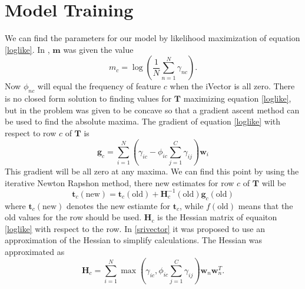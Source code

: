 \section{Model Training}
\label{sect:ivecttrain}

We can find the parameters for our model by likelihood maximization of equation \ref{loglike}. In \cite{lrivector}, $\mathbf{m}$ was given the value
\begin{equation}
\label{mest}
m_c=\log\left(\frac{1}{N} \sum_{n=1}^N \gamma_{nc}\right).
\end{equation} 
Now $\phi_{nc}$ will equal the frequency of feature $c$ when the iVector is all zero. There is no closed form solution to finding values for $\mathbf{T}$ maximizing equation \ref{loglike}, but in \cite{lrivector} the problem was given to be concave so that a gradient ascent method can be used to find the absolute maxima. The gradient of equation \ref{loglike} with respect to row $c$ of $\mathbf{T}$ is
\begin{equation}
\label{tgrad}
\mathbf{g}_c = \sum_{i=1}^N\left(\gamma_{ic} - \phi_{ic} \sum_{j=1}^C \gamma_{ij} \right) \mathbf{w}_i
\end{equation}
This gradient will be all zero at any maxima. We can find this point by using the iterative Newton Rapshon method, there new estimates for row $c$ of $\mathbf{T}$ will be
\begin{equation}
\label{tupdate}
\mathbf{t}_c(\text{new}) = \mathbf{t}_c(\text{old})+\mathbf{H}_c^{-1}(\text{old})\mathbf{g}_c(\text{old})
\end{equation}
where $\mathbf{t}_c(\text{new})$ denotes the new estiamte for $\mathbf{t}_c$, while $f(\text{old})$ means that the old values for the row should be used. $\mathbf{H}_c$ is the Hessian matrix of equaiton \ref{loglike} with respect to the row. In \ref{srivector} it was proposed to use an approximation of the Hessian to simplify calculations. The Hessian was approximated as
\begin{equation}
\label{thessian}
\mathbf{H}_c = \sum_{i=1}^N \max\left(\gamma_{ic}, \phi_{ic} \sum_{j=1}^C \gamma_{ij}\right)\mathbf{w}_n \mathbf{w}_n^T.
\end{equation}

